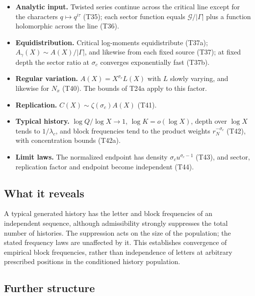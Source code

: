 \documentclass[
  11pt,
]{article}
\providecommand{\tightlist}{%
  \setlength{\itemsep}{0pt}\setlength{\parskip}{0pt}}
\begin{document}
\begin{itemize}
\tightlist
\item
  \textbf{Analytic input.} Twisted series continue across the critical
  line except for the characters \(q\mapsto q^{i\tau}\) (T35); each
  sector function equals \(\mathcal G/|\Gamma|\) plus a function
  holomorphic across the line (T36).
\item
  \textbf{Equidistribution.} Critical log-moments equidistribute (T37a);
  \(A_\gamma(X)\sim A(X)/|\Gamma|\), and likewise from each fixed source
  (T37); at fixed depth the sector ratio at \(\sigma_c\) converges
  exponentially fast (T37b).
\item
  \textbf{Regular variation.} \(A(X)=X^{\sigma_c}L(X)\) with \(L\)
  slowly varying, and likewise for \(N_x\) (T40). The bounds of T24a
  apply to this factor.
\item
  \textbf{Replication.} \(C(X)\sim\zeta(\sigma_c)A(X)\) (T41).
\item
  \textbf{Typical history.} \(\log Q/\log X\to1\), \(\log K=o(\log X)\),
  depth over \(\log X\) tends to \(1/\lambda_c\), and block frequencies
  tend to the product weights \(r_N^{-\sigma_c}\) (T42), with
  concentration bounds (T42a).
\item
  \textbf{Limit laws.} The normalized endpoint has density
  \(\sigma_cu^{\sigma_c-1}\) (T43), and sector, replication factor and
  endpoint become independent (T44).
\end{itemize}

\hypertarget{what-it-reveals-4}{%
\subsection{What it reveals}\label{what-it-reveals-4}}

A typical generated history has the letter and block frequencies of an
independent sequence, although admissibility strongly suppresses the
total number of histories. The suppression acts on the size of the
population; the stated frequency laws are unaffected by it. This
establishes convergence of empirical block frequencies, rather than
independence of letters at arbitrary prescribed positions in the
conditioned history population.

\hypertarget{further-structure-4}{%
\subsection{Further structure}\label{further-structure-4}}
\end{document}
